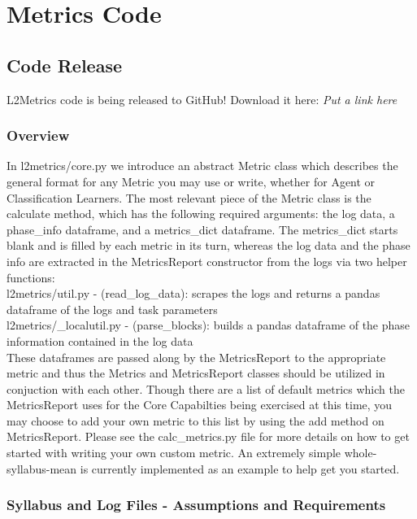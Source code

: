\chapter{Metrics Code}\label{ch:metrics_code}

\section{Code Release}

L2Metrics code is being released to GitHub! Download it here: \textit{Put a link here}

\subsection{Overview} 

In l2metrics/core.py we introduce an abstract Metric class which describes the general format for any Metric you may use or write, whether for Agent or Classification Learners. The most relevant piece of the Metric class is the calculate method, which has the following required arguments: the log data, a phase\_info dataframe, and a metrics\_dict dataframe. The metrics\_dict starts blank and is filled by each metric in its turn, whereas the log data and the phase info are extracted in the MetricsReport constructor from the logs via two helper functions: \\[0.1in]

l2metrics/util.py - (read\_log\_data): scrapes the logs and returns a pandas dataframe of the logs and task parameters\\
l2metrics/\_localutil.py - (parse\_blocks): builds a pandas dataframe of the phase information contained in the log data\\[0.1in]

These dataframes are passed along by the MetricsReport to the appropriate metric and thus the Metrics and MetricsReport classes should be utilized in conjuction with each other. Though there are a list of default metrics which the MetricsReport uses for the Core Capabilties being exercised at this time, you may choose to add your own metric to this list by using the add method on MetricsReport. Please see the calc\_metrics.py file for more details on how to get started with writing your own custom metric. An extremely simple whole-syllabus-mean is currently implemented as an example to help get you started.


\subsection*{Syllabus and Log Files - Assumptions and Requirements}

